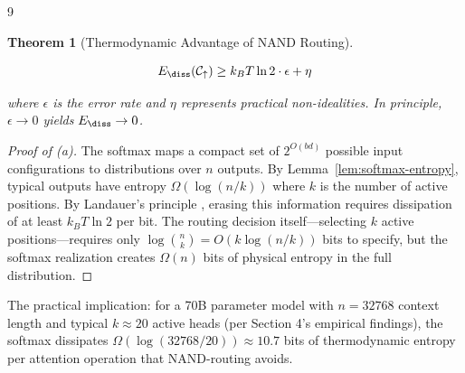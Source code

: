 \documentclass[11pt]{article}
\newtheorem{theorem}{Theorem}[section]
\theoremstyle{definition}
\newcommand{\nand}{\mathbin{\uparrow}}
\begin{document}
\begin{thebibliography}{9}
{{{\begin{theorem}[Thermodynamic Advantage of NAND Routing]
\begin{enumerate}
    \[






    E_{\diss}(\mathcal{C}_{\nand}) \geq k_B T \ln 2 \cdot \epsilon + \eta






    \]






    where $\epsilon$ is the error rate and $\eta$ represents practical non-idealities. In principle, $\epsilon \to 0$ yields $E_{\diss} \to 0$.






\end{enumerate}






\end{theorem}













\begin{proof}[Proof of (a)]






The softmax maps a compact set of $2^{O(bd)}$ possible input configurations to distributions over $n$ outputs. By Lemma~\ref{lem:softmax-entropy}, typical outputs have entropy $\Omega(\log(n/k))$ where $k$ is the number of active positions. By Landauer's principle \cite{landauer1961}, erasing this information requires dissipation of at least $k_B T \ln 2$ per bit. The routing decision itself—selecting $k$ active positions—requires only $\log \binom{n}{k} = O(k \log(n/k))$ bits to specify, but the softmax realization creates $\Omega(n)$ bits of physical entropy in the full distribution.






\end{proof}













The practical implication: for a 70B parameter model with $n = 32768$ context length and typical $k \approx 20$ active heads (per Section 4's empirical findings), the softmax dissipates $\Omega(\log(32768/20)) \approx 10.7$ bits of thermodynamic entropy per attention operation that NAND-routing avoids.













}}}
\end{thebibliography}
\end{document}
